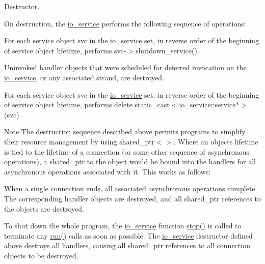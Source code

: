 Destructor. 

On destruction, the \hyperlink{classasio_1_1io__service}{io\+\_\+service} performs the following sequence of operations\+:

\begin{DoxyItemize}
\item For each service object {\ttfamily svc} in the \hyperlink{classasio_1_1io__service}{io\+\_\+service} set, in reverse order of the beginning of service object lifetime, performs {\ttfamily svc-\/$>$shutdown\+\_\+service()}.\end{DoxyItemize}
\begin{DoxyItemize}
\item Uninvoked handler objects that were scheduled for deferred invocation on the \hyperlink{classasio_1_1io__service}{io\+\_\+service}, or any associated strand, are destroyed.\end{DoxyItemize}
\begin{DoxyItemize}
\item For each service object {\ttfamily svc} in the \hyperlink{classasio_1_1io__service}{io\+\_\+service} set, in reverse order of the beginning of service object lifetime, performs {\ttfamily delete static\+\_\+cast$<$io\+\_\+service\+::service$\ast$$>$(svc)}.\end{DoxyItemize}
\begin{DoxyNote}{Note}
The destruction sequence described above permits programs to simplify their resource management by using {\ttfamily shared\+\_\+ptr$<$$>$}. Where an object\textquotesingle{}s lifetime is tied to the lifetime of a connection (or some other sequence of asynchronous operations), a {\ttfamily shared\+\_\+ptr} to the object would be bound into the handlers for all asynchronous operations associated with it. This works as follows\+:
\end{DoxyNote}
\begin{DoxyItemize}
\item When a single connection ends, all associated asynchronous operations complete. The corresponding handler objects are destroyed, and all {\ttfamily shared\+\_\+ptr} references to the objects are destroyed.\end{DoxyItemize}
\begin{DoxyItemize}
\item To shut down the whole program, the \hyperlink{classasio_1_1io__service}{io\+\_\+service} function \hyperlink{classasio_1_1io__service_afd2dad56dd1d0d1adfbcf4d9f1c3912f}{stop()} is called to terminate any \hyperlink{classasio_1_1io__service_ac84bed0d1dd061bc71010ba1228439da}{run()} calls as soon as possible. The \hyperlink{classasio_1_1io__service}{io\+\_\+service} destructor defined above destroys all handlers, causing all {\ttfamily shared\+\_\+ptr} references to all connection objects to be destroyed. \end{DoxyItemize}


